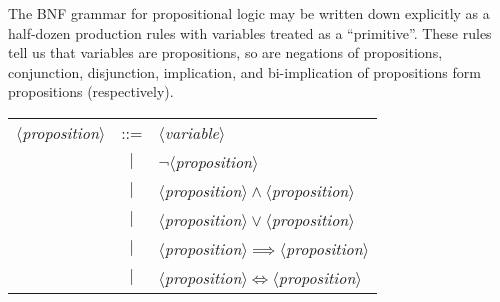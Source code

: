 \begin{node}\label{prop-000I}%
The BNF grammar for propositional logic may be written down explicitly
as a half-dozen production rules with variables treated as a
``primitive''. These rules tell us that variables are propositions,
so are negations of propositions, conjunction, disjunction, implication,
and bi-implication of propositions form propositions (respectively).
\begin{center}
\begin{tabular}{rcl}
$\langle$\textit{proposition}$\rangle$ & ::= & $\langle$\textit{variable}$\rangle$\\
& $|$ & $\neg\langle$\textit{proposition}$\rangle$\\
& $|$ & $\langle$\textit{proposition}$\rangle\land\langle$\textit{proposition}$\rangle$\\
& $|$ & $\langle$\textit{proposition}$\rangle\lor\langle$\textit{proposition}$\rangle$\\
& $|$ & $\langle$\textit{proposition}$\rangle\implies\langle$\textit{proposition}$\rangle$\\
& $|$ & $\langle$\textit{proposition}$\rangle\iff\langle$\textit{proposition}$\rangle$\\
\end{tabular}
\end{center}
\end{node}
